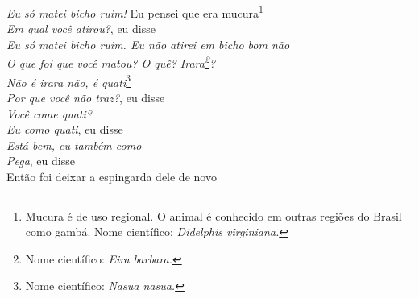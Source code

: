 \begin{linenumbers}\begingroup\raggedright
 
\noindent   \emph{Eu só matei bicho ruim!}
  Eu pensei que era mucura\footnote{Mucura é de uso regional. O animal é conhecido em outras regiões do Brasil como gambá. Nome científico: \emph{Didelphis virginiana.}}\\ %
  \emph{Em qual você atirou?}, eu disse\\
  \emph{Eu só matei bicho ruim. Eu não atirei em bicho bom não}\\
  \emph{O que foi que você matou? O quê? Irara\footnote{Nome científico: \emph{Eira barbara.}}?}\\
  \emph{Não é irara não, é quati}\footnote{Nome científico: \emph{Nasua nasua.}}\\
  \emph{Por que você não traz?}, eu disse\\
  \emph{Você come quati?}\\
  \emph{Eu como quati}, eu disse\\
  \emph{Está bem, eu também como}\\
  \emph{Pega}, eu disse\\
  Então foi deixar a espingarda dele de novo
 
\end{linenumbers}\endgroup

\bigskip

